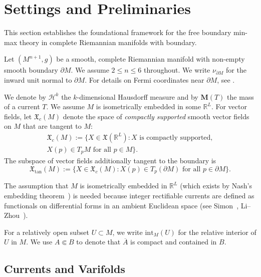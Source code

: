 \section{Settings and Preliminaries}\label{ch:preliminaries}

This section establishes the foundational framework for the free boundary min-max theory in complete Riemannian manifolds with boundary.

Let $(M^{n+1}, g)$ be a smooth, complete Riemannian manifold with non-empty smooth boundary $\partial M$. We assume $2 \leq n \leq 6$ throughout. We write $\nu_{\partial M}$ for the inward unit normal to $\partial M$. For details on Fermi coordinates near $\partial M$, see \cite[Section~2]{LZ17}.

We denote by $\mathcal{H}^k$ the $k$-dimensional Hausdorff measure and by $\mathbf{M}(T)$ the mass of a current $T$. We assume $M$ is isometrically embedded in some $\mathbb{R}^L$. For vector fields, let $\mathfrak{X}_c(M)$ denote the space of \emph{compactly supported} smooth vector fields on $M$ that are tangent to $M$:
\begin{multline*}
\mathfrak{X}_c(M) := \bigl\{X \in \mathfrak{X}(\mathbb{R}^L) : X \text{ is compactly supported},\\
X(p) \in T_p M \text{ for all } p \in M\bigr\}.
\end{multline*}
The subspace of vector fields additionally tangent to the boundary is
\[
\mathfrak{X}_{\mathrm{tan}}(M) := \{X \in \mathfrak{X}_c(M) : X(p) \in T_p(\partial M) \text{ for all } p \in \partial M\}.
\]

\begin{remark}\label{rem:isometric-embedding}
The assumption that $M$ is isometrically embedded in $\mathbb{R}^L$ (which exists by Nash's embedding theorem~\cite{Nash56}) is needed because integer rectifiable currents are defined as functionals on differential forms in an ambient Euclidean space (see Simon~\cite[\S26--27]{Sim84}, Li--Zhou~\cite[\S3]{LZ17}).
\end{remark}

For a relatively open subset $U \subset M$, we write $\mathrm{int}_M(U)$ for the relative interior of $U$ in $M$. We use $A \Subset B$ to denote that $\overline{A}$ is compact and contained in $B$.


\subsection{Currents and Varifolds}\label{sec:currents-varifolds}

